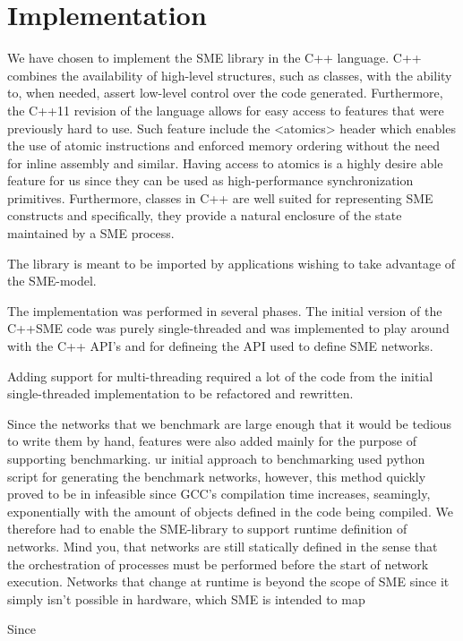 \chapter{Implementation}

We have chosen to implement the SME library in the C++ language. C++
combines the availability of high-level structures, such as classes,
with the ability to, when needed, assert low-level control over the
code generated. Furthermore, the C++11 revision of the language allows
for easy access to features that were previously hard to use. Such
feature include the <atomics> header which enables the use of atomic
instructions and enforced memory ordering without the need for inline
assembly and similar. Having access to atomics is a highly desire able
feature for us since they can be used as high-performance
synchronization primitives. Furthermore, classes in C++ are well suited for
representing SME constructs and specifically, they provide a natural
enclosure of the state maintained by a SME process.

The library is meant to be imported by applications wishing to take
advantage of the SME-model.

The implementation was performed in several phases. The initial
version of the C++SME code was purely single-threaded and was
implemented to play around with the C++ API's and for defineing the
API used to define SME networks.

Adding support for multi-threading required a lot of the code from the
initial single-threaded implementation to be refactored and rewritten.

Since the networks that we benchmark are large enough that it would be
tedious to write them by hand, features were also added mainly for the
purpose of supporting benchmarking.  ur initial approach to
benchmarking used python script for generating the benchmark networks,
however, this method quickly proved to be in infeasible since GCC's
compilation time increases, seamingly, exponentially with the amount
of objects defined in the code being compiled. We therefore had to
enable the SME-library to support runtime definition of networks. Mind
you, that networks are still statically defined in the sense that the
orchestration of processes must be performed before the start of
network execution. Networks that change at runtime is beyond the scope
of SME since it simply isn't possible in hardware, which SME is
intended to map 

Since 

